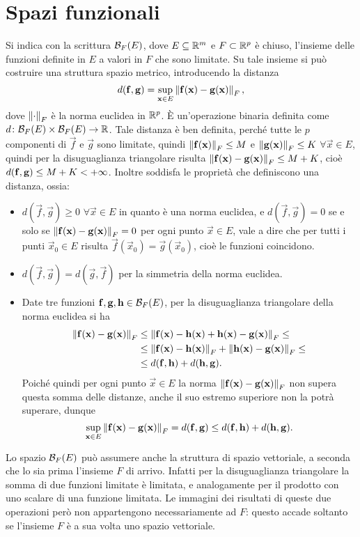 \section{Spazi funzionali}
\label{sec:spazi-funz}
Si indica con la scrittura $\mathcal{B}_{F}({E})$, dove $E\subseteq\mathbb{R}^m$ e $F\subset\mathbb{R}^p$ è chiuso, l'insieme delle funzioni definite in $E$ a valori in $F$ che sono limitate. Su tale insieme si può costruire una struttura spazio metrico, introducendo la distanza
\[
d(\mathbf{f},\mathbf{g})=\sup_{\mathbf{x}\in E}\left\|{\mathbf{f}(\mathbf{x})-\mathbf{g}(\mathbf{x})}\right\|_F,
\]
dove $\left\|{\cdot}\right\|_F$ è la norma euclidea in $\mathbb{R}^p$. È un'operazione binaria definita come $d\colon\mathcal{B}_{F}({E})\times\mathcal{B}_{F}({E})\to\mathbb{R}$.
Tale distanza è ben definita, perché tutte le $p$ componenti di $\vec f$ e $\vec g$ sono limitate, quindi $\left\|{\mathbf{f}(\mathbf{x})}\right\|_F\leq M$ e $\left\|{\mathbf{g}(\mathbf{x})}\right\|_F\leq K$ $\forall\vec x\in E$, quindi per la disuguaglianza triangolare risulta $\left\|{\mathbf{f}(\mathbf{x})-\mathbf{g}(\mathbf{x})}\right\|_F\leq M+K$, cioè $d(\mathbf{f},\mathbf{g})\leq M+K<+\infty$.
Inoltre soddisfa le proprietà che definiscono una distanza, ossia:
\begin{itemize}
	\item $d(\vec f,\vec g)\ge 0$ $\forall\vec x\in E$ in quanto è una norma euclidea, e $d(\vec f,\vec g)=0$ se e solo se $\left\|{\mathbf{f}(\mathbf{x})-\mathbf{g}(\mathbf{x})}\right\|_F=0$ per ogni punto $\vec x\in E$, vale a dire che per tutti i punti $\vec x_0\in E$ risulta $\vec f(\vec x_0)=\vec g(\vec x_0)$, cioè le funzioni coincidono.
	\item $d(\vec f,\vec g)=d(\vec g,\vec f)$ per la simmetria della norma euclidea.
	\item Date tre funzioni $\mathbf{f},\mathbf{g},\mathbf{h}\in\mathcal{B}_{F}({E})$, per la disuguaglianza triangolare della norma euclidea si ha
	\begin{equation}
		\begin{split}
			\left\|{\mathbf{f}(\mathbf{x})-\mathbf{g}(\mathbf{x})}\right\|_F&\leq\left\|{\mathbf{f}(\mathbf{x})-\mathbf{h}(\mathbf{x})+\mathbf{h}(\mathbf{x})-\mathbf{g}(\mathbf{x})}\right\|_F\leq\\
			&\leq\left\|{\mathbf{f}(\mathbf{x})-\mathbf{h}(\mathbf{x})}\right\|_F+\left\|{\mathbf{h}(\mathbf{x})-\mathbf{g}(\mathbf{x})}\right\|_F\leq\\
			&\leq d(\mathbf{f},\mathbf{h})+d(\mathbf{h},\mathbf{g}).
		\end{split}
	\end{equation}
Poiché quindi per ogni punto $\vec x\in E$ la norma $\left\|{\mathbf{f}(\mathbf{x})-\mathbf{g}(\mathbf{x})}\right\|_F$ non supera questa somma delle distanze, anche il suo estremo superiore non la potrà superare, dunque
\[
\sup_{\mathbf{x}\in E}\left\|{\mathbf{f}(\mathbf{x})-\mathbf{g}(\mathbf{x})}\right\|_F=d(\mathbf{f},\mathbf{g})\leq d(\mathbf{f},\mathbf{h})+d(\mathbf{h},\mathbf{g}).
\]
\end{itemize}
Lo spazio $\mathcal{B}_{F}({E})$ può assumere anche la struttura di spazio vettoriale, a seconda che lo sia prima l'insieme $F$ di arrivo. Infatti per la disuguaglianza triangolare la somma di due funzioni limitate è limitata, e analogamente per il prodotto con uno scalare di una funzione limitata. Le immagini dei risultati di queste due operazioni però non appartengono necessariamente ad $F$: questo accade soltanto se l'insieme $F$ è a sua volta uno spazio vettoriale.

